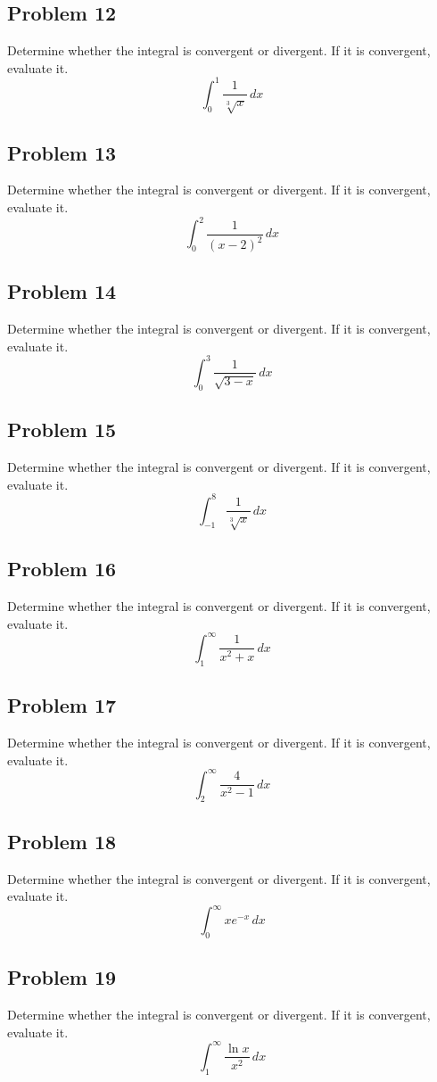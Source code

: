 \documentclass{article}
\begin{document}
\subsection*{Problem 12}
Determine whether the integral is convergent or divergent. If it is convergent, evaluate it.
\[ \int_{0}^{1} \frac{1}{\sqrt[3]{x}} \,dx \]

\subsection*{Problem 13}
Determine whether the integral is convergent or divergent. If it is convergent, evaluate it.
\[ \int_{0}^{2} \frac{1}{(x-2)^2} \,dx \]

\subsection*{Problem 14}
Determine whether the integral is convergent or divergent. If it is convergent, evaluate it.
\[ \int_{0}^{3} \frac{1}{\sqrt{3-x}} \,dx \]

\subsection*{Problem 15}
Determine whether the integral is convergent or divergent. If it is convergent, evaluate it.
\[ \int_{-1}^{8} \frac{1}{\sqrt[3]{x}} \,dx \]

\subsection*{Problem 16}
Determine whether the integral is convergent or divergent. If it is convergent, evaluate it.
\[ \int_{1}^{\infty} \frac{1}{x^2+x} \,dx \]

\subsection*{Problem 17}
Determine whether the integral is convergent or divergent. If it is convergent, evaluate it.
\[ \int_{2}^{\infty} \frac{4}{x^2-1} \,dx \]

\subsection*{Problem 18}
Determine whether the integral is convergent or divergent. If it is convergent, evaluate it.
\[ \int_{0}^{\infty} x e^{-x} \,dx \]

\subsection*{Problem 19}
Determine whether the integral is convergent or divergent. If it is convergent, evaluate it.
\[ \int_{1}^{\infty} \frac{\ln x}{x^2} \,dx \]
\end{document}
